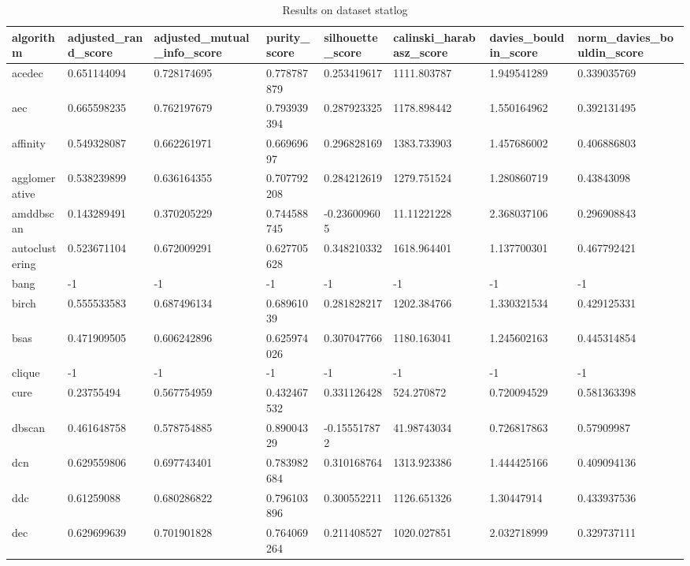 \begin{table}[H]
\centering
\caption{Results on dataset statlog}
\label{S68_Table}
\begin{tabular}{|l|l|l|l|l|l|l|l|}
\hline
algorithm & adjusted\_rand\_score & adjusted\_mutual\_info\_score & purity\_score & silhouette\_score & calinski\_harabasz\_score & davies\_bouldin\_score & norm\_davies\_bouldin\_score \\
\hline
acedec & 0.651144094 & 0.728174695 & 0.778787879 & 0.253419617 & 1111.803787 & 1.949541289 & 0.339035769 \\
\hline
aec & 0.665598235 & 0.762197679 & 0.793939394 & 0.287923325 & 1178.898442 & 1.550164962 & 0.392131495 \\
\hline
affinity & 0.549328087 & 0.662261971 & 0.66969697 & 0.296828169 & 1383.733903 & 1.457686002 & 0.406886803 \\
\hline
agglomerative & 0.538239899 & 0.636164355 & 0.707792208 & 0.284212619 & 1279.751524 & 1.280860719 & 0.43843098 \\
\hline
amddbscan & 0.143289491 & 0.370205229 & 0.744588745 & -0.236009605 & 11.11221228 & 2.368037106 & 0.296908843 \\
\hline
autoclustering & 0.523671104 & 0.672009291 & 0.627705628 & 0.348210332 & 1618.964401 & 1.137700301 & 0.467792421 \\
\hline
bang & -1 & -1 & -1 & -1 & -1 & -1 & -1 \\
\hline
birch & 0.555533583 & 0.687496134 & 0.68961039 & 0.281828217 & 1202.384766 & 1.330321534 & 0.429125331 \\
\hline
bsas & 0.471909505 & 0.606242896 & 0.625974026 & 0.307047766 & 1180.163041 & 1.245602163 & 0.445314854 \\
\hline
clique & -1 & -1 & -1 & -1 & -1 & -1 & -1 \\
\hline
cure & 0.23755494 & 0.567754959 & 0.432467532 & 0.331126428 & 524.270872 & 0.720094529 & 0.581363398 \\
\hline
dbscan & 0.461648758 & 0.578754885 & 0.89004329 & -0.155517872 & 41.98743034 & 0.726817863 & 0.57909987 \\
\hline
dcn & 0.629559806 & 0.697743401 & 0.783982684 & 0.310168764 & 1313.923386 & 1.444425166 & 0.409094136 \\
\hline
ddc & 0.61259088 & 0.680286822 & 0.796103896 & 0.300552211 & 1126.651326 & 1.30447914 & 0.433937536 \\
\hline
dec & 0.629699639 & 0.701901828 & 0.764069264 & 0.211408527 & 1020.027851 & 2.032718999 & 0.329737111 \\

\end{tabular}
\end{table}
